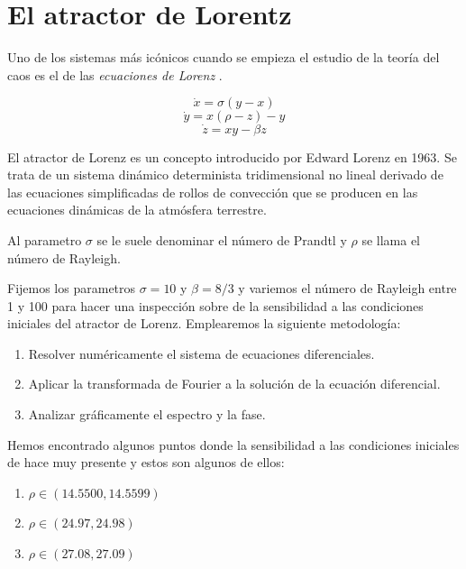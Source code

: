 \section{El atractor de Lorentz}
\label{El atractor de Lorentz}

Uno de los sistemas más icónicos cuando se empieza el estudio de la teoría del caos es el de las
\emph{ecuaciones de Lorenz} .

\begin{definition}
    \begin{equation}
        \dot{x} = \sigma (y-x)
    \end{equation}
    \begin{equation}
        \dot{y} = x(\rho - z) - y
    \end{equation}
    \begin{equation}
        \dot{z} = xy - \beta z
    \end{equation}
\end{definition}

El atractor de Lorenz es un concepto introducido por Edward Lorenz en 1963. Se trata de un sistema dinámico
determinista tridimensional no lineal derivado de las ecuaciones simplificadas de rollos de convección que
se producen en las ecuaciones dinámicas de la atmósfera terrestre.

Al parametro $\sigma$ se le suele denominar el número de Prandtl y $\rho$ se llama el número de Rayleigh.

Fijemos los parametros $\sigma = 10$ y $\beta = 8/3$ y variemos el número de Rayleigh entre 1 y 100 para hacer una inspección
sobre de la sensibilidad a las condiciones iniciales del atractor de Lorenz. Emplearemos la siguiente metodología:

\begin{enumerate}
    \item Resolver numéricamente el sistema de ecuaciones diferenciales.
    \item Aplicar la transformada de Fourier a la solución de la ecuación diferencial.
    \item Analizar gráficamente el espectro y la fase.
\end{enumerate}

\newpage

\onecolumn

Hemos encontrado algunos puntos donde la sensibilidad a las condiciones iniciales de hace muy presente y estos
son algunos de ellos:

\begin{enumerate}
    \item $\rho \in (14.5500, 14.5599) $
    \item $\rho \in (24.97, 24.98) $
    \item $\rho \in (27.08, 27.09) $
\end{enumerate}

